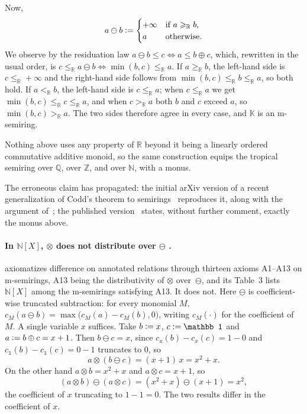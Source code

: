 \begin{toappendix}
  Now,
  \[
    a\ominus b\mathrel{\mathop:}=
    \begin{cases}
      +\infty & \text{if $a\geqslant_{\mathbb R}b$,}\\
      a & \text{otherwise.}
    \end{cases}
  \]
  We observe by the residuation law $a\ominus b\leq c\iff a\leq b\oplus c$, which,
  rewritten in the usual order, is $c\leq_{\mathbb R}a\ominus b\iff
  \min(b,c)\leq_{\mathbb R}a$. If $a\geq_{\mathbb R}b$, the left-hand side is
  $c\leq_{\mathbb R}+\infty$ and the right-hand side follows from
  $\min(b,c)\leq_{\mathbb R}b\leq_{\mathbb R}a$, so both hold. If
  $a<_{\mathbb R}b$, the left-hand side is $c\leq_{\mathbb R}a$; when
  $c\leq_{\mathbb R}a$ we get $\min(b,c)\leq_{\mathbb R}c\leq_{\mathbb R}a$,
  and when $c>_{\mathbb R}a$ both $b$ and $c$ exceed $a$, so
  $\min(b,c)>_{\mathbb R}a$. The two sides therefore agree in every case, and
  $\mathbb K$ is an m-semiring.

  Nothing above uses any property of $\mathbb R$ beyond it being a linearly
  ordered commutative additive monoid, so the same construction equips the
  tropical semiring over $\mathbb Q$, over $\mathbb Z$, and over $\mathbb N$, with a monus.

  The erroneous claim has propagated: the initial arXiv version of a
  recent generalization of Codd's theorem to
  semirings~\cite{badia2025coddarxiv} reproduces it, along with the
  argument of~\cite[Example~4]{geerts2010database}; the published
  version~\cite{badia2025codd} states, without further comment, exactly
  the monus above.

  \paragraph*{In $\mathbb N[X]$, $\otimes$ does not distribute over $\ominus$
  .}
  \cite{amsterdamer2011limitations} axiomatizes difference on annotated
  relations through thirteen axioms A1--A13 on m-semirings, A13 being
  the distributivity of $\otimes$ over~$\ominus$, and its Table~3 lists
  $\mathbb N[X]$ among the m-semirings satisfying A13. It does not.
  Here $\ominus$ is coefficient-wise truncated subtraction: for every
  monomial $M$, $c_M(a\ominus b)=\max\bigl(c_M(a)-c_M(b),0\bigr)$, writing
  $c_M(\cdot)$ for the coefficient of $M$. A single variable $x$ suffices.
  Take $b\mathrel{\mathop:}= x$, $c\defeq\mathbb 1$ and $a\mathrel{\mathop:}= b\oplus c=x+1$. Then
  $b\ominus c=x$, since $c_x(b)-c_x(c)=1-0$ and $c_{\mathbb 1}(b)-c_{\mathbb
  1}(c)=0-1$ truncates to $0$, so
  \[
    a\otimes(b\ominus c)=(x+1)\,x=x^2+x .
  \]
  On the other hand $a\otimes b=x^2+x$ and $a\otimes c=x+1$, so
  \[
    (a\otimes b)\ominus(a\otimes c)=(x^2+x)\ominus(x+1)=x^2 ,
  \]
  the coefficient of $x$ truncating to $1-1=0$. The two results differ in the
  coefficient of $x$.


\end{toappendix}

